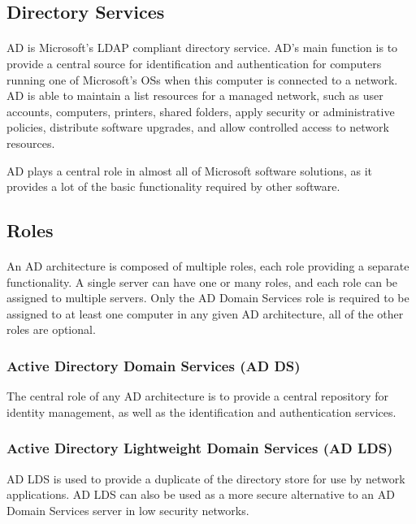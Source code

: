 \subsection{Directory Services}
\paragraph{}
AD is Microsoft's LDAP compliant directory service. AD's main function is to provide a central source for identification and authentication for computers running one of Microsoft's OSs when this computer is connected to a network. AD is able to maintain a list resources for a managed network, such as user accounts, computers, printers, shared folders, apply security or administrative policies, distribute software upgrades, and allow controlled access to network resources.

AD plays a central role in almost all of Microsoft software solutions, as it provides a lot of the basic functionality required by other software\cite{desmond_active_2008}.


\subsection{Roles}
\paragraph{}
An AD architecture is composed of multiple roles, each role providing a separate functionality. A single server can have one or many roles, and each role can be assigned to multiple servers. Only the AD Domain Services role is required to be assigned to at least one computer in any given AD architecture, all of the other roles are optional.\cite[p. 5-7]{holme_self-paced_2011}

\subsubsection{Active Directory Domain Services (AD DS)}
The central role of any AD architecture is to provide a central repository for identity management, as well as the identification and authentication services.

\subsubsection{Active Directory Lightweight Domain Services (AD LDS)}
AD LDS is used to provide a duplicate of the directory store for use by network applications. AD LDS can also be used as a more secure alternative to an AD Domain Services server in low security networks.

